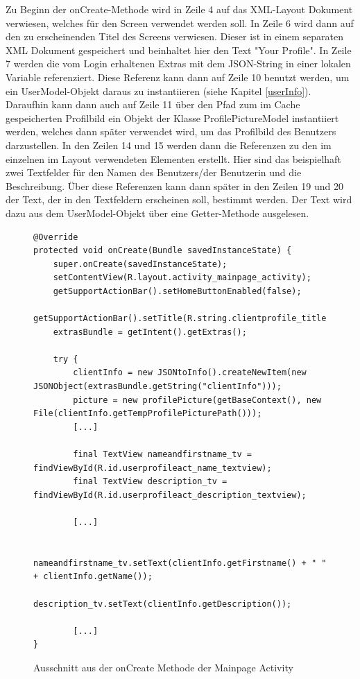 \documentclass[a4paper,11pt]{report}
\begin{document}
			Zu Beginn der onCreate-Methode wird in Zeile 4 auf das  XML-Layout Dokument verwiesen, welches für den Screen verwendet werden soll. In Zeile 6 wird dann auf den zu erscheinenden Titel des Screens verwiesen. Dieser ist in einem separaten XML Dokument gespeichert und beinhaltet hier den Text "Your Profile". In Zeile 7 werden die vom Login erhaltenen Extras mit dem JSON-String in einer lokalen Variable referenziert. Diese Referenz kann dann auf Zeile 10 benutzt werden, um ein UserModel-Objekt daraus zu instantiieren (siehe Kapitel \ref{userInfo}). Daraufhin kann dann auch auf Zeile 11 über den Pfad zum im Cache gespeicherten Profilbild ein Objekt der Klasse ProfilePictureModel instantiiert werden, welches dann später verwendet wird, um das Profilbild des Benutzers darzustellen. In den Zeilen 14 und 15 werden dann die Referenzen zu den im einzelnen im Layout verwendeten Elementen erstellt. Hier sind das beispielhaft zwei Textfelder für den Namen des Benutzers/der Benutzerin und die Beschreibung. Über diese Referenzen kann dann später in den Zeilen 19 und 20 der Text, der in den Textfeldern erscheinen soll, bestimmt werden. Der Text wird dazu aus dem UserModel-Objekt über eine Getter-Methode ausgelesen. 
\begin{figure}
	\begin{center}
		\begin{verbatim}
@Override
protected void onCreate(Bundle savedInstanceState) {
	super.onCreate(savedInstanceState);
	setContentView(R.layout.activity_mainpage_activity);
	getSupportActionBar().setHomeButtonEnabled(false);
	getSupportActionBar().setTitle(R.string.clientprofile_title);
	extrasBundle = getIntent().getExtras();
	
	try {
		clientInfo = new JSONtoInfo().createNewItem(new JSONObject(extrasBundle.getString("clientInfo")));
		picture = new profilePicture(getBaseContext(), new File(clientInfo.getTempProfilePicturePath()));
		[...]
	
		final TextView nameandfirstname_tv = findViewById(R.id.userprofileact_name_textview);
		final TextView description_tv = findViewById(R.id.userprofileact_description_textview);
	
		[...]
	
		nameandfirstname_tv.setText(clientInfo.getFirstname() + " " + clientInfo.getName());
		description_tv.setText(clientInfo.getDescription());
	
		[...]
}
		\end{verbatim}
	\caption{Ausschnitt aus der onCreate Methode der Mainpage Activity}\label{java:onCreate}
	\end{center}

\end{figure}
		
\end{document}
